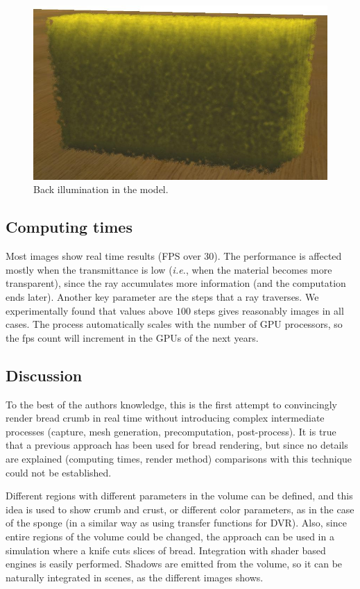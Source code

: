 \documentclass[oneside,a4paper,english,links]{amca}
\begin{document}
\begin{figure}[htb!]
  \centerline{\includegraphics[scale=0.25]{fig7}}
  \caption{Back illumination in the model. }
  \label{fg:fig7}
\end{figure}


\subsection{Computing times}
Most images show real time results (FPS over 30). The performance is affected mostly when the transmittance is low ({\em i.e.}, when the material becomes more transparent), since the ray accumulates more information (and the computation ends later). Another key parameter are the steps that a ray traverses. We experimentally found that values above $100$ steps gives reasonably images in all cases. The process automatically scales with the number of GPU processors, so the fps count will increment in the GPUs of the next years.

\subsection{Discussion}
To the best of the authors knowledge, this is the first attempt to convincingly render bread crumb in real time without introducing complex intermediate processes (capture, mesh generation, precomputation, post-process). It is true that a previous approach \citep{Cho2007} has been used for bread rendering, but since no details are explained (computing times, render method) comparisons with this technique could not be established.

Different regions with different parameters in the volume can be defined, and this idea is used to show crumb and crust, or different color parameters, as in the case of the sponge (in a similar way as using transfer functions for DVR). Also, since entire regions of the volume could be changed, the approach can be used in a simulation where a knife cuts slices of bread. Integration with shader based engines is easily performed. Shadows are emitted from the volume, so it can be naturally integrated in scenes, as the different images shows.
\end{document}
